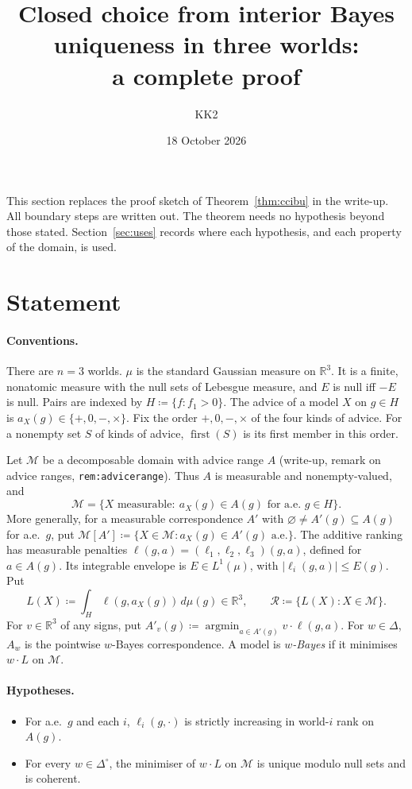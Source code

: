 \documentclass[11pt]{article}
\title{Closed choice from interior Bayes uniqueness in three worlds:\\ a complete proof}
\author{KK2}
\date{18 October 2026}
\theoremstyle{remark}
\newcommand{\R}{\mathbb R}
\newcommand{\Di}{\Delta^{\circ}}
\newcommand{\M}{\mathcal M}
\newcommand{\Rr}{\mathcal R}
\DeclareMathOperator*{\argmin}{argmin}
\newcommand{\first}{\operatorname{first}}
\begin{document}
\maketitle

\noindent This section replaces the proof sketch of Theorem~\ref{thm:ccibu} in the write-up. All boundary steps are written out. The theorem needs no hypothesis beyond those stated. Section~\ref{sec:uses} records where each hypothesis, and each property of the domain, is used.

\section{Statement}\label{sec:statement}

\paragraph{Conventions.} There are $n=3$ worlds. $\mu$ is the standard Gaussian measure on $\R^3$. It is a finite, nonatomic measure with the null sets of Lebesgue measure, and $E$ is null iff $-E$ is null. Pairs are indexed by $H\coloneqq\{f:f_1>0\}$. The advice of a model $X$ on $g\in H$ is $a_X(g)\in\{+,0,-,\times\}$. Fix the order $+,0,-,\times$ of the four kinds of advice. For a nonempty set $S$ of kinds of advice, $\first(S)$ is its first member in this order.

Let $\M$ be a decomposable domain with advice range $A$ (write-up, remark on advice ranges, \texttt{rem:advicerange}). Thus $A$ is measurable and nonempty-valued, and
\begin{equation}\label{eq:D}\tag{D}
\M=\{X\text{ measurable}:\ a_X(g)\in A(g)\text{ for a.e.\ }g\in H\}.
\end{equation}
More generally, for a measurable correspondence $A'$ with $\varnothing\ne A'(g)\subseteq A(g)$ for a.e.\ $g$, put $\M[A']\coloneqq\{X\in\M:a_X(g)\in A'(g)\text{ a.e.}\}$. The additive ranking has measurable penalties $\ell(g,a)=(\ell_1,\ell_2,\ell_3)(g,a)$, defined for $a\in A(g)$. Its integrable envelope is $E\in L^1(\mu)$, with $|\ell_i(g,a)|\le E(g)$. Put
\[
L(X)\coloneqq\int_H\ell(g,a_X(g))\,d\mu(g)\in\R^3,\qquad \Rr\coloneqq\{L(X):X\in\M\}.
\]
For $v\in\R^3$ of any signs, put $A'_v(g)\coloneqq\argmin_{a\in A'(g)}v\cdot\ell(g,a)$. For $w\in\Delta$, $A_w$ is the pointwise $w$-Bayes correspondence. A model is \emph{$w$-Bayes} if it minimises $w\cdot L$ on $\M$.

\paragraph{Hypotheses.}
\begin{itemize}[leftmargin=*]
\item[(G)] For a.e.\ $g$ and each $i$, $\ell_i(g,\cdot)$ is strictly increasing in world-$i$ rank on $A(g)$.
\item[(BU)] For every $w\in\Di$, the minimiser of $w\cdot L$ on $\M$ is unique modulo null sets and is coherent.
\end{itemize}
\end{document}
